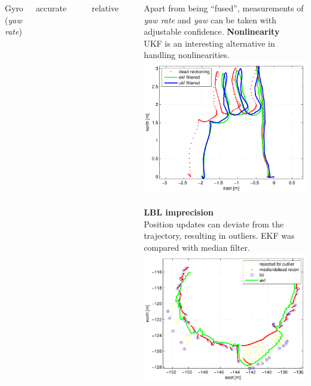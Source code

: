 \begin{frame}
\begin{columns}[t]
\begin{columns}[t]
	{\centering	
	Gyro \\ {\footnotesize(\textit{yaw rate})} \\
	\pro    \begin{footnotesize}accurate\end{footnotesize}	\\
	\contra \begin{footnotesize}relative\end{footnotesize}  \\
	} %
	\end{columns}
\vspace{10pt}
Apart from being ``fused'', measurements of \textit{yaw rate} and \textit{yaw} can be taken with adjustable confidence. 	
{\centering \textbf{Nonlinearity}} \\
UKF \cite{julier96} is an interesting alternative in handling nonlinearities. 
\includegraphics[width=0.85\linewidth]{fig/UKFpipeTrack.pdf} \\
 \\
{\centering \textbf{LBL imprecision}} \\ %
Position updates can deviate from the trajectory, resulting in outliers. EKF was compared with median filter.  \\  
{\centering
\includegraphics[width=0.8\linewidth]{fig/spiral-median-ekf.pdf} \\
}
\end{columns}
\end{frame}
